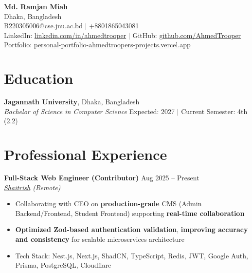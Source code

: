\documentclass[10pt,a4paper]{article}
\begin{document}
\begin{center}
    {\LARGE \textbf{Md. Ramjan Miah}} \\[3pt]
    Dhaka, Bangladesh \\[2pt]
    \href{mailto:B220305006@cse.jnu.ac.bd}{B220305006@cse.jnu.ac.bd} $|$ +8801865043081 \\[2pt]
    LinkedIn: \href{https://linkedin.com/in/ahmedtrooper}{linkedin.com/in/ahmedtrooper} $|$ 
    GitHub: \href{https://github.com/AhmedTrooper}{github.com/AhmedTrooper} \\[2pt]
    Portfolio: \href{https://personal-portfolio-ahmedtroopers-projects.vercel.app}{personal-portfolio-ahmedtroopers-projects.vercel.app}
\end{center}

\vspace{-4pt}

\section{Education}
\textbf{Jagannath University}, Dhaka, Bangladesh \\
\textit{Bachelor of Science in Computer Science} \hfill Expected: 2027 $|$ Current Semester: 4th (2.2)

\section{Professional Experience}
\textbf{Full-Stack Web Engineer (Contributor)} \hfill Aug 2025 -- Present \\
\textit{\href{https://www.shaitrish.com/}{Shaitrish} (Remote)} \\[-6pt]
\begin{itemize}[leftmargin=12pt, itemsep=0pt, topsep=2pt]
    \item Collaborating with CEO on \textbf{production-grade} CMS (Admin Backend/Frontend, Student Frontend) supporting \textbf{real-time collaboration}
    \item \textbf{Optimized Zod-based authentication validation}, \textbf{improving accuracy and consistency} for scalable microservices architecture
    \item Tech Stack: Nest.js, Next.js, ShadCN, TypeScript, Redis, JWT, Google Auth, Prisma, PostgreSQL, Cloudflare
\end{itemize}

\end{document}
